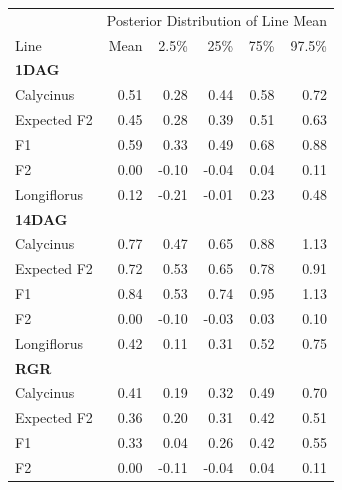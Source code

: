 \documentclass[
  letterpaper,
  DIV=11,
  numbers=noendperiod]{scrartcl}
\begin{document}
\begin{table}
\centering
\begin{tabular}[t]{l|r|r|r|r|r}
\hline
\multicolumn{1}{c|}{ } & \multicolumn{5}{c}{Posterior Distribution of Line Mean} \\
\cline{2-6}
Line & Mean & 2.5\% & 25\% & 75\% & 97.5\%\\
\hline
\multicolumn{6}{l}{\textbf{1DAG}}\\
\hline
\hspace{1em}Calycinus & 0.51 & 0.28 & 0.44 & 0.58 & 0.72\\
\hline
\hspace{1em}Expected F2 & 0.45 & 0.28 & 0.39 & 0.51 & 0.63\\
\hline
\hspace{1em}F1 & 0.59 & 0.33 & 0.49 & 0.68 & 0.88\\
\hline
\hspace{1em}F2 & 0.00 & -0.10 & -0.04 & 0.04 & 0.11\\
\hline
\hspace{1em}Longiflorus & 0.12 & -0.21 & -0.01 & 0.23 & 0.48\\
\hline
\multicolumn{6}{l}{\textbf{14DAG}}\\
\hline
\hspace{1em}Calycinus & 0.77 & 0.47 & 0.65 & 0.88 & 1.13\\
\hline
\hspace{1em}Expected F2 & 0.72 & 0.53 & 0.65 & 0.78 & 0.91\\
\hline
\hspace{1em}F1 & 0.84 & 0.53 & 0.74 & 0.95 & 1.13\\
\hline
\hspace{1em}F2 & 0.00 & -0.10 & -0.03 & 0.03 & 0.10\\
\hline
\hspace{1em}Longiflorus & 0.42 & 0.11 & 0.31 & 0.52 & 0.75\\
\hline
\multicolumn{6}{l}{\textbf{RGR}}\\
\hline
\hspace{1em}Calycinus & 0.41 & 0.19 & 0.32 & 0.49 & 0.70\\
\hline
\hspace{1em}Expected F2 & 0.36 & 0.20 & 0.31 & 0.42 & 0.51\\
\hline
\hspace{1em}F1 & 0.33 & 0.04 & 0.26 & 0.42 & 0.55\\
\hline
\hspace{1em}F2 & 0.00 & -0.11 & -0.04 & 0.04 & 0.11\\

\end{tabular}
\end{table}
\end{document}
